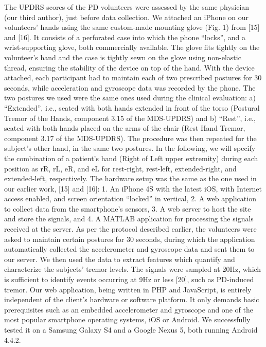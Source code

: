 The UPDRS scores of the PD volunteers were assessed by the same physician (our third author), just before data collection. We attached an iPhone on our volunteers’ hands using the same custom-made mounting glove (Fig. 1) from [15] and [16]. It consists of a perforated case into which the phone “locks”, and a wrist-supporting glove, both commercially available. The glove fits tightly on the volunteer’s hand and the case is tightly sewn on the glove using non-elastic thread, ensuring the stability of the device on top of the hand. With the device attached, each participant had to maintain each of two prescribed postures for 30 seconds, while acceleration and gyroscope data was recorded by the phone. The two postures we used were the same ones used during the clinical evaluation: a) “Extended”, i.e., seated with both hands extended in front of the torso (Postural Tremor of the Hands, component 3.15 of the MDS-UPDRS) and b) “Rest”, i.e., seated with both hands placed on the arms of the chair (Rest Hand Tremor, component 3.17 of the MDS-UPDRS). The procedure was then repeated for the subject’s other hand, in the same two postures. In the following, we will specify the combination of a patient’s hand (Right of Left upper extremity) during each position as rR, rL, eR, and eL for rest-right, rest-left, extended-right, and extended-left, respectively.
The hardware setup was the same as the one used in our earlier work, [15] and [16]: 
1.	An iPhone 4S with the latest iOS, with Internet access enabled, and screen orientation ``locked'' in vertical,
2.	A web application to collect data from the smartphone’s sensors,
3.	A web server to host the site and store the signals, and
4.	A MATLAB application for processing the signals received at the server.
As per the protocol described earlier, the volunteers were asked to maintain certain postures for 30 seconds, during which the application automatically collected the accelerometer and gyroscope data and sent them to our server. We then used the data to extract features which quantify and characterize the subjects’ tremor levels. The signals were sampled at 20Hz, which is sufficient to identify events occurring at 9Hz or less [20], such as PD-induced tremor. 
Our web application, being written in PHP and JavaScript, is entirely independent of the client's hardware or software platform. It only demands basic prerequisites such as an embedded accelerometer and gyroscope and one of the most popular smartphone operating systems, iOS or Android. We successfully tested it on a Samsung Galaxy S4 and a Google Nexus 5, both running Android 4.4.2. 



